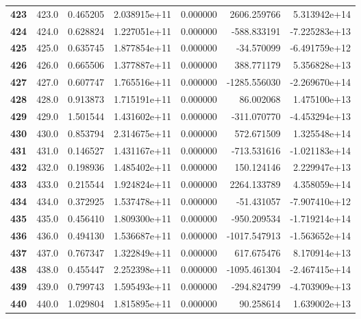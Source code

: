 \documentclass{report}[12pt]
\begin{document}
\begin{center}
\begin{tabular}{lrrrrrr}
\textbf{423 } &          423.0 &   0.465205 &  2.038915e+11 &    0.000000 &  2606.259766 &  5.313942e+14 \\
\textbf{424 } &          424.0 &   0.628824 &  1.227051e+11 &    0.000000 &  -588.833191 & -7.225283e+13 \\
\textbf{425 } &          425.0 &   0.635745 &  1.877854e+11 &    0.000000 &   -34.570099 & -6.491759e+12 \\
\textbf{426 } &          426.0 &   0.665506 &  1.377887e+11 &    0.000000 &   388.771179 &  5.356828e+13 \\
\textbf{427 } &          427.0 &   0.607747 &  1.765516e+11 &    0.000000 & -1285.556030 & -2.269670e+14 \\
\textbf{428 } &          428.0 &   0.913873 &  1.715191e+11 &    0.000000 &    86.002068 &  1.475100e+13 \\
\textbf{429 } &          429.0 &   1.501544 &  1.431602e+11 &    0.000000 &  -311.070770 & -4.453294e+13 \\
\textbf{430 } &          430.0 &   0.853794 &  2.314675e+11 &    0.000000 &   572.671509 &  1.325548e+14 \\
\textbf{431 } &          431.0 &   0.146527 &  1.431167e+11 &    0.000000 &  -713.531616 & -1.021183e+14 \\
\textbf{432 } &          432.0 &   0.198936 &  1.485402e+11 &    0.000000 &   150.124146 &  2.229947e+13 \\
\textbf{433 } &          433.0 &   0.215544 &  1.924824e+11 &    0.000000 &  2264.133789 &  4.358059e+14 \\
\textbf{434 } &          434.0 &   0.372925 &  1.537478e+11 &    0.000000 &   -51.431057 & -7.907410e+12 \\
\textbf{435 } &          435.0 &   0.456410 &  1.809300e+11 &    0.000000 &  -950.209534 & -1.719214e+14 \\
\textbf{436 } &          436.0 &   0.494130 &  1.536687e+11 &    0.000000 & -1017.547913 & -1.563652e+14 \\
\textbf{437 } &          437.0 &   0.767347 &  1.322849e+11 &    0.000000 &   617.675476 &  8.170914e+13 \\
\textbf{438 } &          438.0 &   0.455447 &  2.252398e+11 &    0.000000 & -1095.461304 & -2.467415e+14 \\
\textbf{439 } &          439.0 &   0.799743 &  1.595493e+11 &    0.000000 &  -294.824799 & -4.703909e+13 \\
\textbf{440 } &          440.0 &   1.029804 &  1.815895e+11 &    0.000000 &    90.258614 &  1.639002e+13 \\

\end{tabular}
\end{center}
\end{document}
